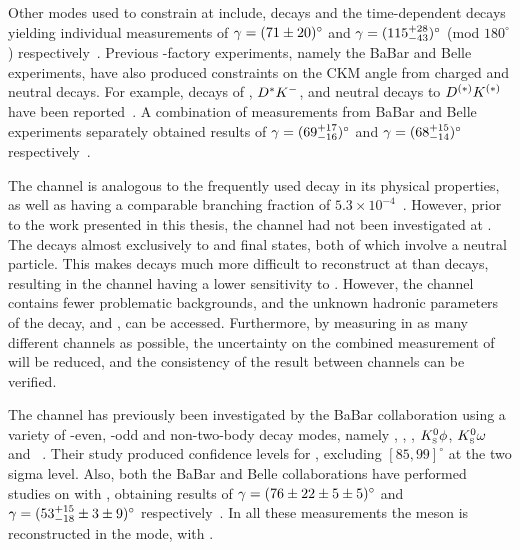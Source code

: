 Other modes used to constrain \Pgamma at \lhcb include, \decay{\Bz}{\D\Kstarz} decays and the time-dependent \decay{\Bs}{\Dspm\Kmp} decays yielding individual measurements of $\gamma = (71 \pm 20)^{\circ}$ and $\gamma = (115^{+28}_{-43})^{\circ}$ (mod $180^{\circ}$) respectively~\cite{LHCb-PAPER-2016-006,LHCb-PAPER-2014-038}. Previous \B-factory experiments, namely the BaBar and Belle experiments, have also produced constraints on the CKM angle \Pgamma from charged and neutral \B decays. For example, decays of \decay{\Bm}{\D\Km}, ${D}^*{{K}^-}$, \D\Kstarm and neutral \B decays to ${D}^{(*)}K^{(*)}$ have been reported~\cite{BabarGLW_latest,BabarADS_latest,BaBar-Gamma-2013,BaBarGGSZ,BaBar_B0,BelleGLW_latest,BelleADS_latest,BelleGGSZ}. A combination of measurements from BaBar and Belle experiments separately obtained results of $\gamma = (69^{+17}_{-16})^{\circ}$ and $\gamma = (68^{+15}_{-14})^{\circ}$ respectively~\cite{Babar_gamma,Belle_gamma}.

The \decay{\Bm}{\D\Kstarm} channel is analogous to the frequently used \decay{\Bm}{\D\Km} decay in its physical properties, as well as having a comparable branching fraction of $5.3 \times 10^{-4}$~\cite{PDG2016}. However, prior to the work presented in this thesis, the \decay{\Bm}{\D\Kstarm} channel had not been investigated at \lhcb. The \Kstarm decays almost exclusively to \Kz\pim and \Km\piz final states, both of which involve a neutral particle. This makes \decay{\Bm}{\D\Kstarm} decays much more difficult to reconstruct at \lhcb than \decay{\Bm}{\D\Km} decays, resulting in the \decay{\Bm}{\D\Kstarm} channel having a lower sensitivity to \Pgamma. However, the \decay{\Bm}{\D\Kstarm} channel contains fewer problematic backgrounds, and the unknown hadronic parameters of the \decay{\Bm}{\D\Kstarm} decay, \rb and \deltab, can be accessed. Furthermore, by measuring \Pgamma in as many different channels as possible, the uncertainty on the combined measurement of \Pgamma will be reduced, and the consistency of the result between channels can be verified. 

The \decay{\Bm}{\D\Kstarm} channel has previously been investigated by the BaBar collaboration using a variety of \CP-even, \CP-odd and non-\CP two-body \D decay modes, namely \Km\Kp, \pim\pip, \KS\piz, ${{K}^0_{\mathrm{ \scriptscriptstyle S}}}\phi$, ${{K}^0_{\mathrm{ \scriptscriptstyle S}}}\omega$ and \Km\pip~\cite{BaBarDKstar}. Their study produced confidence levels for \Pgamma, excluding $[85,99]^{\circ}$ at the two sigma level. Also, both the BaBar and Belle collaborations have performed studies on \decay{\Bm}{\D\Kstarm} with \decay{\D}{\KS\pip\pim}, obtaining results of $\gamma = (76 \pm 22 \pm 5 \pm 5)^{\circ}$ and $\gamma = (53^{+15}_{-18} \pm 3 \pm 9)^{\circ}$ respectively~\cite{BaBarGGSZ,BelleGGSZ}. In all these measurements the \Kstarm meson is reconstructed in the \KS\pim mode, with \decay{\KS}{\pip\pim}.

